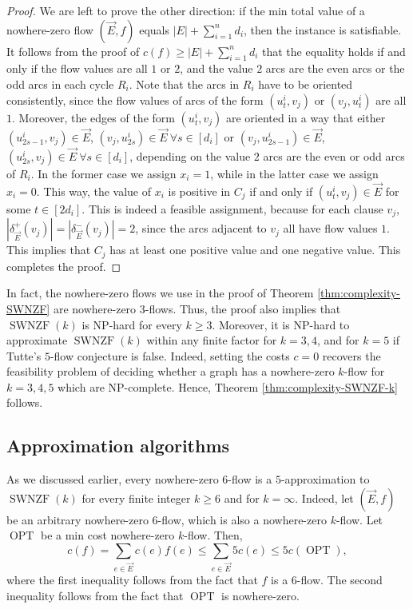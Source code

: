 \documentclass[11pt]{article}
\DeclareMathOperator{\opt}{OPT}
\begin{document}
\begin{proof}
    We are left to prove the other direction: if the min total value of a nowhere-zero flow $(\vec{E},f)$ equals $|E|+\sum_{i=1}^nd_i$, then the instance is satisfiable. It follows from the proof of $c(f)\geq |E|+\sum_{i=1}^nd_i$ that the equality holds if and only if the flow values are all $1$ or $2$, and the value $2$ arcs are the even arcs or the odd arcs in each cycle $R_i$. Note that the arcs in $R_i$ have to be oriented consistently, since the flow values of arcs of the form $(u^i_t,v_j)$ or $(v_j,u^i_t)$ are all $1$. Moreover, the edges of the form $(u^i_t,v_j)$ are oriented in a way that either $(u^i_{2s-1},v_j)\in \vec{E}$, $(v_j,u^i_{2s})\in \vec{E}\ \forall s\in[d_i]$ or $(v_j,u^i_{2s-1})\in \vec{E}$, $(u^i_{2s},v_j)\in \vec{E}\ \forall s\in[d_i]$, depending on the value $2$ arcs are the even or odd arcs of $R_i$. In the former case we assign $x_i=1$, while in the latter case we assign $x_i=0$. This way, the value of $x_i$ is positive in $C_j$ if and only if $(u^i_t,v_j)\in \vec{E}$ for some $t\in [2d_i]$. This is indeed a feasible assignment, because for each clause $v_j$, $|\delta_{\vec{E}}^+(v_j)|=|\delta_{\vec{E}}^-(v_j)|=2$, since the arcs adjacent to $v_j$ all have flow values $1$. This implies that $C_j$ has at least one positive value and one negative value. This completes the proof.
\end{proof}
In fact, the nowhere-zero flows we use in the proof of Theorem \ref{thm:complexity-SWNZF} are nowhere-zero $3$-flows. Thus, the proof also implies that $\operatorname{SWNZF}(k)$ is NP-hard for every $k\geq 3$. Moreover, it is NP-hard to approximate $\operatorname{SWNZF}(k)$ within any finite factor for $k=3,4$, and for $k=5$ if Tutte's $5$-flow conjecture is false. Indeed, setting the costs $c=0$ recovers the feasibility problem of deciding whether a graph has a nowhere-zero $k$-flow for $k=3,4,5$ which are NP-complete.
Hence, Theorem \ref{thm:complexity-SWNZF-k} follows.



\subsection{Approximation algorithms}\label{sec:SWNZF-approx}
As we discussed earlier, every nowhere-zero $6$-flow is a $5$-approximation to $\operatorname{SWNZF}(k)$ for every finite integer $k\geq 6$ and for $k=\infty$.  Indeed, let $(\vec{E},f)$ be an arbitrary nowhere-zero $6$-flow, which is also a nowhere-zero $k$-flow. Let $\opt$ be a min cost nowhere-zero $k$-flow. Then,
\[
c(f)=\sum_{e\in\vec{E}} c(e)f(e)\leq \sum_{e\in\vec{E}} 5c(e)\leq 5c(\opt),
\]
where the first inequality follows from the fact that $f$ is a $6$-flow. The second inequality follows from the fact that $\opt$ is nowhere-zero.
\end{document}
